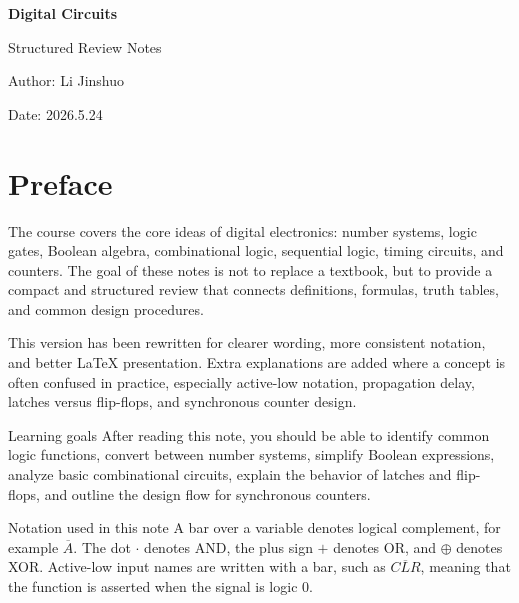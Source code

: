 \documentclass[11pt,a4paper]{article}
\begin{document}
\begin{titlepage}
\centering
\vspace*{2.5cm}
{\Huge\bfseries\sffamily\color{Primary} Digital Circuits\par}
\vspace{0.6cm}
{\Large Structured Review Notes\par}
\vspace{1.8cm}
{\large Author: Li Jinshuo\par}
\vspace{0.2cm}
{\large Date: 2026.5.24\par}
\vfill
\end{titlepage}

\tableofcontents
\clearpage
{}

\section*{Preface}
The course covers the core ideas of digital electronics: number systems,
logic gates, Boolean algebra, combinational logic, sequential logic,
timing circuits, and counters. The goal of these notes is not to replace
a textbook, but to provide a compact and structured review that connects
definitions, formulas, truth tables, and common design procedures.

This version has been rewritten for clearer wording, more consistent
notation, and better LaTeX presentation. Extra explanations are added
where a concept is often confused in practice, especially active-low
notation, propagation delay, latches versus flip-flops, and synchronous
counter design.

\begin{conceptbox}{Learning goals}
After reading this note, you should be able to identify common logic functions, convert between number systems, simplify Boolean expressions, analyze basic combinational circuits, explain the behavior of latches and flip-flops, and outline the design flow for synchronous counters.
\end{conceptbox}

\begin{notebox}{Notation used in this note}
A bar over a variable denotes logical complement, for example $\overline{A}$. The dot $\cdot$ denotes AND, the plus sign $+$ denotes OR, and $\oplus$ denotes XOR. Active-low input names are written with a bar, such as $\overline{CLR}$, meaning that the function is asserted when the signal is logic 0.
\end{notebox}
\end{document}
